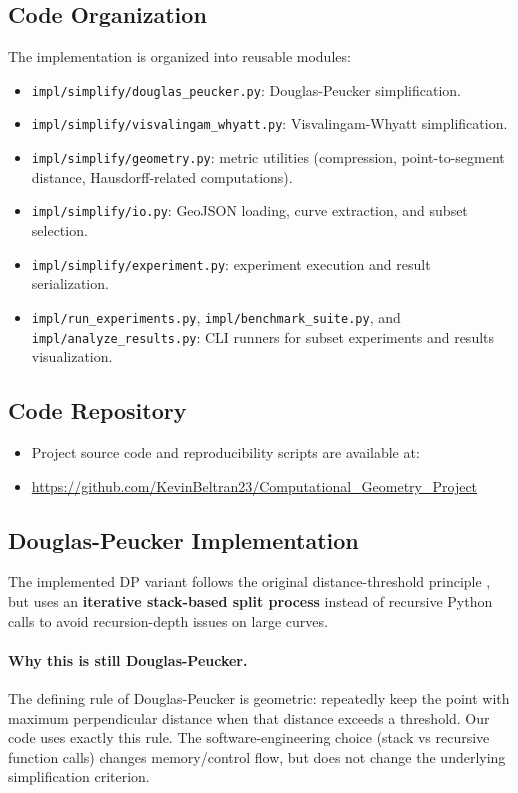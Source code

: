 \documentclass[12pt]{article}
\begin{document}
\subsection{Code Organization}
The implementation is organized into reusable modules:
\begin{itemize}
    \item \texttt{impl/simplify/douglas\_peucker.py}: Douglas-Peucker simplification.
    \item \texttt{impl/simplify/visvalingam\_whyatt.py}: Visvalingam-Whyatt simplification.
    \item \texttt{impl/simplify/geometry.py}: metric utilities (compression, point-to-segment distance, Hausdorff-related computations).
    \item \texttt{impl/simplify/io.py}: GeoJSON loading, curve extraction, and subset selection.
    \item \texttt{impl/simplify/experiment.py}: experiment execution and result serialization.
    \item \texttt{impl/run\_experiments.py}, \texttt{impl/benchmark\_suite.py}, and \texttt{impl/analyze\_results.py}: CLI runners for subset experiments and results visualization.
\end{itemize}

\subsection{Code Repository}
\begin{itemize}
    \item Project source code and reproducibility scripts are available at:
    \item \url{https://github.com/KevinBeltran23/Computational_Geometry_Project}
\end{itemize}

\subsection{Douglas-Peucker Implementation}
The implemented DP variant follows the original distance-threshold principle \cite{dp1973,ramer1972}, but uses an \textbf{iterative stack-based split process} instead of recursive Python calls to avoid recursion-depth issues on large curves.

\paragraph{Why this is still Douglas-Peucker.}
The defining rule of Douglas-Peucker is geometric: repeatedly keep the point with maximum perpendicular distance when that distance exceeds a threshold. Our code uses exactly this rule. The software-engineering choice (stack vs recursive function calls) changes memory/control flow, but does not change the underlying simplification criterion.
\end{document}
